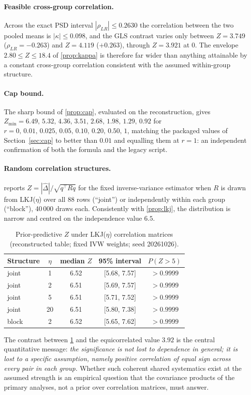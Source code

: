 \documentclass[11pt,a4paper]{article}
\theoremstyle{remark}\newtheorem{remark}{Remark}
\begin{document}
\paragraph{Feasible cross-group correlation.} Across the exact PSD interval $|\rho_{LR}|\le0.2630$ the correlation between the two pooled means is $|\kappa|\le0.098$, and the GLS contrast varies only between $Z=3.749$ ($\rho_{LR}=-0.263$) and $Z=4.119$ ($+0.263$), through $Z=3.921$ at $0$. The envelope $2.80\le Z\le18.4$ of \cref{prop:kappa} is therefore far wider than anything attainable by a constant cross-group correlation consistent with the assumed within-group structure.

\paragraph{Cap bound.} The sharp bound of \cref{prop:cap}, evaluated on the reconstruction, gives $Z_{\min}=6.49,\,5.32,\,4.36,\,3.51,\,2.68,\,1.98,\,1.29,\,0.92$ for $r=0,\,0.01,\,0.025,\,0.05,\,0.10,\,0.20,\,0.50,\,1$, matching the packaged values of Section~\ref{sec:cap} to better than $0.01$ and equalling them at $r=1$: an independent confirmation of both the formula and the legacy script.

\paragraph{Random correlation structures.}  reports $Z=|\widehat\Delta|/\sqrt{q^{\!\top}Rq}$ for the fixed inverse-variance estimator when $R$ is drawn from LKJ($\eta$) over all 88 rows (``joint'') or independently within each group (``block''), 40\,000 draws each. Consistently with \cref{prop:lkj}, the distribution is narrow and centred on the independence value $6.5$.
\begin{table}[t]\centering\small
\caption{Prior-predictive $Z$ under LKJ($\eta$) correlation matrices (reconstructed table; fixed IVW weights; seed 20261026).}\label{tab:lkj}
\begin{tabular}{@{}lcccc@{}}\toprule
Structure & $\eta$ & median $Z$ & 95\% interval & $P(Z>5)$\\\midrule
joint & 1 & 6.52 & [5.68, 7.57] & $>0.9999$\\
joint & 2 & 6.51 & [5.69, 7.57] & $>0.9999$\\
joint & 5 & 6.51 & [5.71, 7.52] & $>0.9999$\\
joint & 20 & 6.51 & [5.80, 7.38] & $>0.9999$\\
block & 2 & 6.52 & [5.65, 7.62] & $>0.9999$\\\bottomrule
\end{tabular}\end{table}
The contrast between \cref{tab:lkj} and the equicorrelated value $3.92$ is the central quantitative message: \emph{the significance is not lost to dependence in general; it is lost to a specific assumption, namely positive correlation of equal sign across every pair in each group.} Whether such coherent shared systematics exist at the assumed strength is an empirical question that the covariance products of the primary analyses, not a prior over correlation matrices, must answer.
\end{document}
